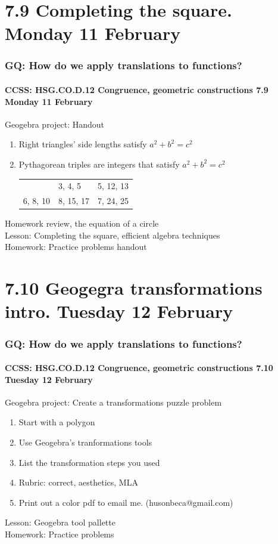 \documentclass{beamer}
\begin{document}
\section{7.9 Completing the square. Monday 11 February}
  \frame
  {
    \frametitle{GQ: How do we apply translations to functions?}
    \framesubtitle{CCSS: HSG.CO.D.12 Congruence, geometric constructions \hfill \alert{7.9 Monday 11 February}}

    \begin{block}{Geogebra project: Handout}
      \begin{enumerate}
        \item Right triangles' side lengths satisfy $a^2+b^2=c^2$
        \item Pythagorean triples are integers that satisfy $a^2+b^2=c^2$\\
        \begin{tabular}{lll}
          & 3, 4, 5 &  5, 12, 13 \\
          6, 8, 10 & 8, 15, 17 & 7, 24, 25
        \end{tabular}
      \end{enumerate}
    \end{block}
    Homework review, the equation of a circle\\
    Lesson: Completing the square, efficient algebra techniques\\[0.5cm]
    Homework: Practice problems handout
  }

\section{7.10 Geogegra transformations intro. Tuesday 12 February}
  \frame
  {
    \frametitle{GQ: How do we apply translations to functions?}
    \framesubtitle{CCSS: HSG.CO.D.12 Congruence, geometric constructions \hfill \alert{7.10 Tuesday 12 February}}

    \begin{block}{Geogebra project: Create a transformations puzzle problem}
      \begin{enumerate}
        \item Start with a polygon
        \item Use Geogebra's tranformations tools
        \item List the transformation steps you used
        \item Rubric: correct, aesthetics, MLA
        \item Print out a color pdf to email me. (husonbeca@gmail.com)
      \end{enumerate}
    \end{block}
    Lesson: Geogebra tool pallette\\[0.5cm]
    Homework: Practice problems
  }
\end{document}
